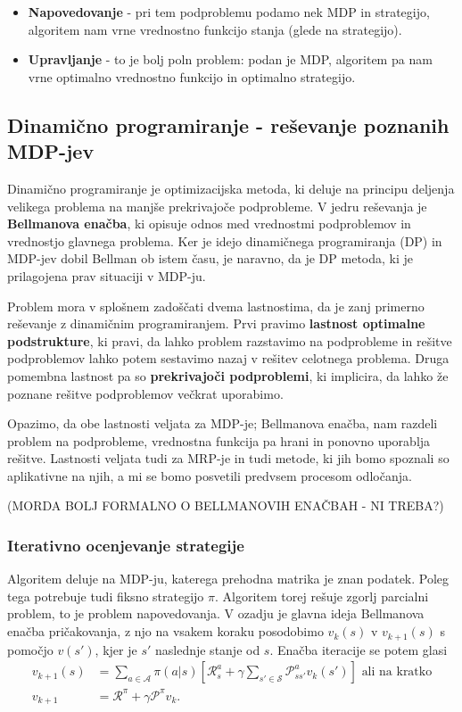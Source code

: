 \documentclass[12pt,a4paper]{amsart}
\theoremstyle{definition} %
\theoremstyle{plain} %
\begin{document}
\begin{itemize}
    \item \textbf{Napovedovanje} - pri tem podproblemu podamo nek MDP in strategijo, algoritem nam 
            vrne vrednostno funkcijo stanja (glede na strategijo).   
    \item \textbf{Upravljanje} - to je bolj poln problem: podan je MDP, algoritem pa nam vrne 
            optimalno vrednostno funkcijo in optimalno strategijo.
\end{itemize}

\subsection{Dinamično programiranje - reševanje poznanih MDP-jev}
Dinamično programiranje je optimizacijska metoda, ki deluje na principu deljenja velikega problema 
na manjše prekrivajoče podprobleme. V jedru reševanja je \textbf{Bellmanova enačba}, ki opisuje 
odnos med vrednostmi podproblemov in vrednostjo glavnega problema. Ker je idejo dinamičnega 
programiranja (DP) in MDP-jev dobil Bellman ob istem času, je naravno, da je DP metoda, ki je 
prilagojena prav situaciji v MDP-ju.

Problem mora v splošnem zadoščati dvema lastnostima, da je zanj primerno reševanje z dinamičnim 
programiranjem. Prvi pravimo \textbf{lastnost optimalne podstrukture}, ki pravi, da lahko problem 
razstavimo na podprobleme in rešitve podproblemov lahko potem sestavimo nazaj v rešitev celotnega 
problema. Druga pomembna lastnost pa so \textbf{prekrivajoči podproblemi}, ki implicira, da lahko 
že poznane rešitve podproblemov večkrat uporabimo.

Opazimo, da obe lastnosti veljata za MDP-je; Bellmanova enačba, nam razdeli problem na 
podprobleme, vrednostna funkcija pa hrani in ponovno uporablja rešitve. Lastnosti veljata tudi 
za MRP-je in tudi metode, ki jih bomo spoznali so aplikativne na njih, a mi se bomo posvetili 
predvsem procesom odločanja.

(MORDA BOLJ FORMALNO O BELLMANOVIH ENAČBAH - NI TREBA?)

\subsubsection{Iterativno ocenjevanje strategije}
Algoritem deluje na MDP-ju, katerega prehodna matrika je znan podatek. Poleg tega potrebuje tudi 
fiksno strategijo $\pi$. Algoritem torej rešuje zgorlj parcialni problem, to je problem 
napovedovanja. V ozadju je glavna ideja Bellmanova enačba pričakovanja, z njo na vsakem koraku 
posodobimo $v_k(s)$ v $v_{k+1}(s)$ s pomočjo $v(s')$, kjer je $s'$
naslednje stanje od $s$. Enačba iteracije se potem glasi 
\begin{align*}
    v_{k+1}(s) &= \sum_{a \in \mathcal{A}} \pi(a|s) \left[ \mathcal{R}_s^a + 
        \gamma \sum_{s' \in \mathcal{S}} \mathcal{P}_{ss'}^a v_k(s') \right] \text{ ali na kratko}\\
    v_{k+1} &= \mathcal{R}^\pi + \gamma \mathcal{P}^\pi v_k.
\end{align*}
\end{document}
